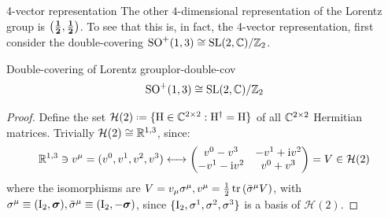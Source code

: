 \begin{observation}{4-vector representation}{}
  The other $ 4 $-dimensional representation of the Lorentz group is $ \mathbf{\left( \frac{1}{2},\frac{1}{2} \right)} $. To see that this is, in fact, the 4-vector representation, first consider the double-covering $ \mathrm{SO}^+(1,3) \cong \mathrm{SL}(2,\mathbb{C}) / \mathbb{Z}_2 $.

\begin{lemma}[before upper = {\tcbtitle}]{Double-covering of Lorentz group}{lor-double-cov}
  \begin{equation}
    \mathrm{SO}^+(1,3) \cong \mathrm{SL}(2,\mathbb{C}) / \mathbb{Z}_2
  \end{equation}
\end{lemma}

\begin{proofbox}
  \begin{proof}
    Define the set $ \mathcal{H}(2) \defeq \{\mt{H} \in \C^{2 \times 2} : \mt{H}\dg = \mt{H}\} $ of all $ \mathbb{C}^{2 \times 2} $ Hermitian matrices. Trivially $ \mathcal{H}(2) \cong \mathbb{R}^{1,3} $, since:
    \begin{equation*}
      \mathbb{R}^{1,3} \ni v^\mu = (v^0,v^1,v^2,v^3) \longleftrightarrow
      \begin{pmatrix}
        v^0 - v^3 & -v^1 + \mathrm{i} v^2 \\
        -v^1 - \mathrm{i} v^2 & v^0 + v^3
      \end{pmatrix}
      = V \in \mathcal{H}(2)
    \end{equation*}
    where the isomorphisms are $ V = v_\mu \sigma^\mu , v^\mu = \frac{1}{2} \operatorname{tr} \left( \bar{\sigma}^\mu V \right) $, with $ \sigma^\mu \equiv (\mathrm{I}_2,\boldsymbol{\sigma}) , \bar{\sigma}^\mu \equiv (\mathrm{I}_2,-\boldsymbol{\sigma}) $, since $ \{\mathrm{I}_2 , \sigma^1 , \sigma^2 , \sigma^3\} $ is a basis of $ \mathcal{H}(2) $.


\end{proof}
\end{proofbox}
\end{observation}

